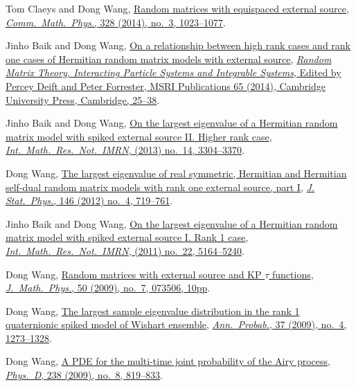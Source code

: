 \documentclass[12pt,a4paper]{article}
\begin{document}
\begin{etaremune}
\item 
  Tom Claeys and Dong Wang,
  \href{http://arxiv.org/abs/1212.3768}{Random matrices with equispaced external source}, \href{https://doi.org/10.1007/s00220-014-1988-y}{\textit{Comm.\ Math.\ Phys.}, 328 (2014), no.\ 3, 1023--1077}.
\item Jinho Baik and Dong Wang,
  \href{http://arxiv.org/abs/1207.0389}{On a relationship between high rank cases and rank one cases of Hermitian random matrix models with external source}, \href{http://www.cambridge.org/asia/catalogue/catalogue.asp?isbn=9781107079922}{\textit{Random Matrix Theory, Interacting Particle Systems and Integrable Systems}, Edited by Percey Deift and Peter Forrester, MSRI Publications 65 (2014), Cambridge University Press, Cambridge, 25--38}.
\item Jinho Baik and Dong Wang,
  \href{http://arxiv.org/abs/1104.2915}{On the largest eigenvalue of a Hermitian random matrix model with spiked external source II. Higher rank case}, \href{https://doi.org/10.1093/imrn/rns136}{\textit{Int.\ Math.\ Res.\ Not.\ IMRN}, (2013) no.\ 14, 3304--3370}.
\item Dong Wang,
  \href{http://arxiv.org/abs/1012.4144}{The largest eigenvalue of real symmetric, Hermitian and Hermitian self-dual random matrix models with rank one external source, part I}, \href{https://doi.org/10.1007/s10955-012-0417-x}{\textit{J. Stat.\ Phys.}, 146 (2012) no.\ 4, 719--761}.
\item Jinho Baik and  Dong Wang,
  \href{http://arxiv.org/abs/1010.4604}{On the largest eigenvalue of a Hermitian random matrix model with spiked external source I. Rank 1 case}, \href{https://doi.org/10.1093/imrn/rnq257}{\textit{Int.\ Math.\ Res.\ Not.\ IMRN}, (2011) no.\ 22, 5164--5240}.
\item Dong Wang,
  \href{http://arxiv.org/abs/0810.0280}{Random matrices with external source and KP $\tau$ functions}, \href{https://doi.org/10.1063/1.3167802}{\textit{J.\ Math.\ Phys.}, 50 (2009), no.\ 7, 073506, 10pp}.
\item Dong Wang,
 \href{http://arxiv.org/abs/0711.2722}{The largest sample eigenvalue distribution in the rank 1 quaternionic spiked model of Wishart ensemble}, \href{https://doi.org/10.1214/08-AOP432}{\textit{Ann.\ Probab.}, 37 (2009), no.\ 4, 1273--1328}.
\item Dong Wang,
  \href{http://arxiv.org/abs/0711.3797}{A PDE for the multi-time joint probability of the Airy process}, \href{https://doi.org/10.1016/j.physd.2009.02.007}{\textit{Phys.\ D}, 238 (2009), no.\ 8, 819--833}.
\end{etaremune}
\end{document}
